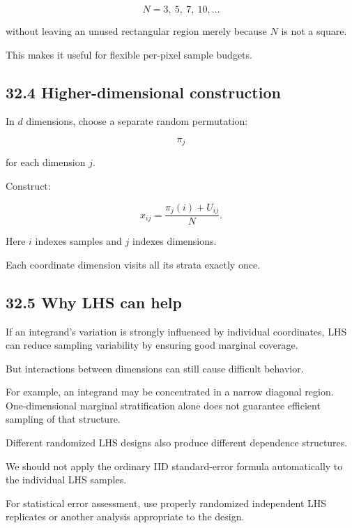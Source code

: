\[ N=3,\ 5,\ 7,\ 10,\ldots \]

without leaving an unused rectangular region merely because \(N\) is not a square.

This makes it useful for flexible per-pixel sample budgets.

\subsection{32.4 Higher-dimensional construction}\label{02-foundations-ii-ch031-higher-dimensional-construction}

\hypertarget{02-foundations-ii-ch031-higher-dimensional-construction}{}

In \(d\) dimensions, choose a separate random permutation:

\[ \pi_j \]

for each dimension \(j\).

Construct:

\[ \boxed{ x_{ij}= \frac{\pi_j(i)+U_{ij}}N }. \]

Here \(i\) indexes samples and \(j\) indexes dimensions.

Each coordinate dimension visits all its strata exactly once.

\subsection{32.5 Why LHS can help}\label{02-foundations-ii-ch031-why-lhs-can-help}

\hypertarget{02-foundations-ii-ch031-why-lhs-can-help}{}

If an integrand's variation is strongly influenced by individual coordinates, LHS can reduce sampling variability by ensuring good marginal coverage.

But interactions between dimensions can still cause difficult behavior.

For example, an integrand may be concentrated in a narrow diagonal region. One-dimensional marginal stratification alone does not guarantee efficient sampling of that structure.

Different randomized LHS designs also produce different dependence structures.

We should not apply the ordinary IID standard-error formula automatically to the individual LHS samples.

For statistical error assessment, use properly randomized independent LHS replicates or another analysis appropriate to the design.

